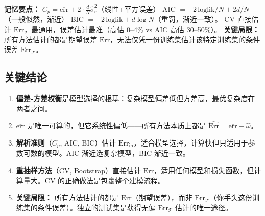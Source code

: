 \textbf{记忆要点：}\quad
$C_p = \overline{\mathrm{err}} + 2\cdot\frac{d}{N}\hat{\sigma}_\varepsilon^2$（线性+平方误差）\;
AIC $= -2\,\text{loglik}/N + 2d/N$（一般似然，渐近）\;
BIC $= -2\,\text{loglik} + d\log N$（重罚，渐近一致）。
CV 直接估计 $\mathrm{Err}$，最通用，误差估计最准（高估 0--4\% vs AIC 高估 30--50\%）。
\textbf{关键局限：} 所有方法估计的都是期望误差 $\mathrm{Err}$，无法仅凭一份训练集估计该特定训练集的条件误差 $\mathrm{Err}_{\mathcal{T}}$。

\subsection{关键结论}

\begin{enumerate}
    \item \textbf{偏差-方差权衡}是模型选择的根基：复杂模型偏差低但方差高，最优复杂度在两者之间。
    \item $\overline{\mathrm{err}}$ 是唯一可算的，但它系统性偏低——所有方法本质上都是 $\widehat{\mathrm{Err}} = \overline{\mathrm{err}} + \hat{\omega}$。
    \item \textbf{解析准则}（$C_p$, AIC, BIC）估计 $\mathrm{Err}_{\text{in}}$，适合模型选择，计算快但只适用于参数可数的模型。AIC 渐近选复杂模型，BIC 渐近一致。
    \item \textbf{重抽样方法}（CV, Bootstrap）直接估计 $\mathrm{Err}$，适用任何模型和损失函数，但计算量大。CV 的正确做法是包裹整个建模流程。
    \item \textbf{关键局限：} 所有方法估计的都是 $\mathrm{Err}$（期望误差），而非 $\mathrm{Err}_{\mathcal{T}}$（你手头这份训练集的条件误差）。独立的测试集是获得无偏 $\mathrm{Err}_{\mathcal{T}}$ 估计的唯一途径。
\end{enumerate}
